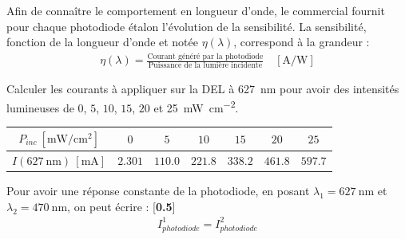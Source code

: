 \documentclass[twoside,a4paper,11pt,addpoints,answers]{exam}%
\newcounter{foo} %
\begin{document}
Afin de connaître le comportement en longueur d'onde, le commercial fournit pour chaque photodiode étalon l'évolution de la sensibilité. La sensibilité, fonction de la longueur d'onde et notée $\eta (\lambda)$, correspond à la grandeur : 
\begin{align*}
\eta (\lambda) = \frac{\text{Courant généré par la photodiode}}{\text{Puissance de la lumière incidente}} \quad [\si{\ampere\per\watt}]
\end{align*}


\begin{questions}

\setcounter{question}{\thefoo}
\question[1\half] Calculer les courants à appliquer sur la DEL à \SI{627}{\nano\meter} pour avoir des intensités lumineuses de $0$, $5$, $10$, $15$, $20$ et \SI{25}{\milli\watt\per\centi\meter\squared}.

\begin{mybox}
\begin{solution}[5cm]

\begin{center}
\begin{tabular}{ccccccc}
\toprule
$P_{inc} ~ [\si{\milli\watt\per\centi\meter\squared}]$ & $0$ & $5$ & $10$ & $15$ & $20$ & $25$ \\
\midrule
$I(627 ~ \si{\nano\meter}) ~ [\si{\milli\ampere}]$ & $2.301$ & $110.0$ & $221.8$ & $338.2$ & $461.8$ & $597.7$ \\
\bottomrule
\end{tabular}
\end{center}

\end{solution}
\end{mybox}

\begin{mybox}
\begin{solution}[5cm]

Pour avoir une réponse constante de la photodiode, en posant $\lambda_1 = 627 ~ \si{\nano\meter}$ et $\lambda_2 = 470 ~ \si{\nano\meter}$, on peut écrire : [\textbf{0.5}]
\begin{align*}
I_{photodiode}^1 = I_{photodiode}^2
\end{align*}


\end{solution}
\end{mybox}
\end{questions}
\end{document}
